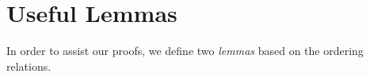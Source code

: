 \section{Useful Lemmas}    
    In order to assist our proofs, we define two \textit{lemmas} based on the ordering relations. 


